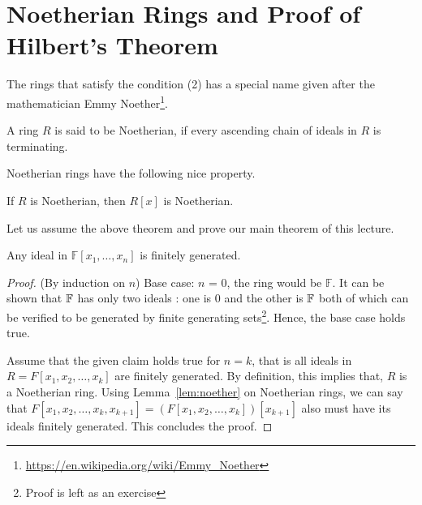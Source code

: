 \section{Noetherian Rings and Proof of Hilbert's Theorem}
The rings that satisfy the condition (2) has a special name given after the
mathematician Emmy Noether\footnote{\url{https://en.wikipedia.org/wiki/Emmy_Noether}}.

\begin{definition}
	A ring $R$ is said to be Noetherian, if every ascending chain of
	ideals in $R$ is terminating.
\end{definition}
Noetherian rings have the following nice property.
\begin{lemma} \label{lem:noether}
If $R$ is Noetherian, then $R[x]$ is Noetherian.
\end{lemma}

Let us assume the above theorem and prove our main theorem of this lecture.
\begin{theorem}
Any ideal in $\mathbb{F}[x_1,\ldots,x_n]$ is finitely generated.
\end{theorem}
\begin{proof}(By induction on $n$)
Base case: $n$ = 0, the ring would be $\mathbb{F}$. It can be shown that
${\mathbb{F}}$ has only two ideals : one is ${0}$ and the other is ${\mathbb{F}}$ both
of which can be verified to be generated by finite generating sets\footnote{
Proof is left as an exercise}. Hence, the base case holds true.

Assume that the given claim holds true for $n=k$, that is all ideals in 
$R = F[x_1,x_2,\ldots,x_k]$ are finitely generated. By definition, this implies
that, $R$ is a Noetherian ring. Using Lemma~\ref{lem:noether} on Noetherian
rings, we can say that $F[x_1,x_2,\ldots,x_k,x_{k+1}] =
(F[x_1,x_2,\ldots,x_k])[x_{k+1}]$ also must have its ideals finitely
generated. This concludes the proof.
\end{proof}


